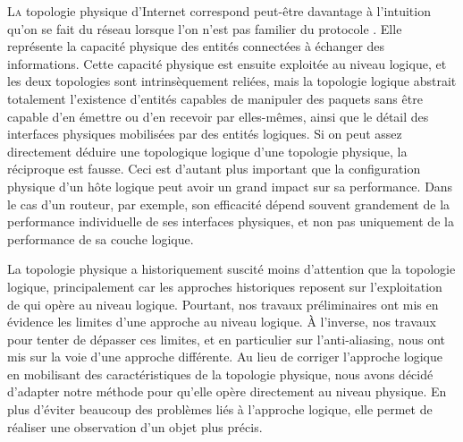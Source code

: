 \label{chap:udpping}
\introformatting

\lettrine{L}{a} topologie physique d'Internet correspond peut-être davantage à
l'intuition qu'on se fait du réseau lorsque l'on n'est pas familier du protocole
\ip. Elle représente la capacité physique des entités connectées à échanger des
informations. Cette capacité physique est ensuite exploitée au niveau logique,
et les deux topologies sont intrinsèquement reliées, mais la topologie logique
abstrait totalement l'existence d'entités capables de manipuler des paquets sans
être capable d'en émettre ou d'en recevoir par elles-mêmes, ainsi que le détail
des interfaces physiques mobilisées par des entités logiques. Si on peut assez
directement déduire une topologique logique d'une topologie physique, la
réciproque est fausse. Ceci est d'autant plus important que la configuration
physique d'un hôte logique peut avoir un grand impact sur sa performance. Dans
le cas d'un routeur, par exemple, son efficacité dépend souvent grandement de la
performance individuelle de ses interfaces physiques, et non pas uniquement de
la performance de sa couche logique.

La topologie physique a historiquement suscité moins d'attention que la
topologie logique, principalement car les approches historiques reposent sur
l'exploitation de \traceroute qui opère au niveau logique. Pourtant, nos travaux
préliminaires ont mis en évidence les limites d'une approche au niveau logique.
À l'inverse, nos travaux pour tenter de dépasser ces limites, et en particulier
sur l'anti-aliasing, nous ont mis sur la voie d'une approche différente. Au lieu
de corriger l'approche logique en mobilisant des caractéristiques de la
topologie physique, nous avons décidé d'adapter notre méthode pour qu'elle opère
directement au niveau physique. En plus d'éviter beaucoup des problèmes liés à
l'approche logique, elle permet de réaliser une observation d'un objet plus
précis.

